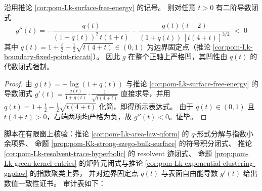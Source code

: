 \begin{corollary}\label{cor:pom-Lk-surface-free-energy-strict-concavity}
沿用推论 \ref{cor:pom-Lk-surface-free-energy} 的记号。
则对任意 \(t>0\) 有二阶导数闭式
\[
\boxed{\;
g''(t)
=-\frac{q(t)}{(1+q(t))^2\,t(4+t)}
-\frac{q(t)(t+2)}{(1+q(t))\,[t(4+t)]^{3/2}}\;<\;0\;}
\]
其中 \(q(t)=1+\frac{t}{2}-\frac12\sqrt{t(4+t)}\in(0,1)\) 为边界固定点（推论 \ref{cor:pom-Lk-boundary-fixed-point-riccati}）。
因此 \(g\) 在整个正轴上严格凹，其凹性由 \(q(t)\) 的代数闭式强制。
\end{corollary}
\begin{proof}
由 \(g(t)=-\log(1+q(t))\) 与推论 \ref{cor:pom-Lk-surface-free-energy} 的导数闭式
\(
g'(t)=\frac{q(t)}{1+q(t)}\cdot\frac{1}{\sqrt{t(4+t)}}
\)
直接求导，并用 \(q(t)=1+\frac{t}{2}-\frac12\sqrt{t(4+t)}\) 化简，即得所示表达式。
由于 \(q(t)\in(0,1)\) 且 \(t(4+t)>0\)，右端两项均严格为负，故 \(g''(t)<0\)。证毕。
\end{proof}

\begin{remark}\label{rem:pom-fence-green-kernel-area-law-audit}
脚本在有限窗上核验：推论 \ref{cor:pom-Lk-area-law-qform} 的 \(q\)-形式分解与指数小余项界、
命题 \ref{prop:pom-Kk-strong-szego-bulk-surface} 的符号积分闭式、
推论 \ref{cor:pom-Lk-resolvent-trace-hyperbolic} 的 resolvent 迹闭式、
命题 \ref{prop:pom-Lk-green-kernel-entries} 的矩阵元闭式与推论 \ref{cor:pom-Lk-exponential-clustering-gaplaw} 的指数聚类上界，
并对边界固定点 \(q(t)\) 与表面自由能导数 \(g'(t)\) 给出数值一致性证书。
审计表如下：

\end{remark}
